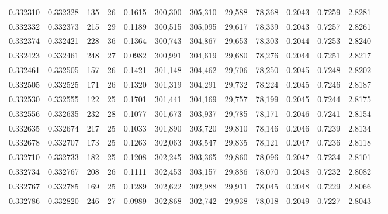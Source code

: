 \begin{tabular}{rrrrrrrrrrrrr}
0.332310 & 0.332328 &   135 &  26 &                                     0.1615 & 300,300 & 305,310 &  29,588 &  78,368 & 0.2043 & 0.7259 & 2.8281 \\
0.332332 & 0.332373 &   215 &  29 &                                     0.1189 & 300,515 & 305,095 &  29,617 &  78,339 & 0.2043 & 0.7257 & 2.8261 \\
0.332374 & 0.332421 &   228 &  36 &                                     0.1364 & 300,743 & 304,867 &  29,653 &  78,303 & 0.2044 & 0.7253 & 2.8240 \\
0.332423 & 0.332461 &   248 &  27 &                                     0.0982 & 300,991 & 304,619 &  29,680 &  78,276 & 0.2044 & 0.7251 & 2.8217 \\
0.332461 & 0.332505 &   157 &  26 &                                     0.1421 & 301,148 & 304,462 &  29,706 &  78,250 & 0.2045 & 0.7248 & 2.8202 \\
0.332505 & 0.332525 &   171 &  26 &                                     0.1320 & 301,319 & 304,291 &  29,732 &  78,224 & 0.2045 & 0.7246 & 2.8187 \\
0.332530 & 0.332555 &   122 &  25 &                                     0.1701 & 301,441 & 304,169 &  29,757 &  78,199 & 0.2045 & 0.7244 & 2.8175 \\
0.332556 & 0.332635 &   232 &  28 &                                     0.1077 & 301,673 & 303,937 &  29,785 &  78,171 & 0.2046 & 0.7241 & 2.8154 \\
0.332635 & 0.332674 &   217 &  25 &                                     0.1033 & 301,890 & 303,720 &  29,810 &  78,146 & 0.2046 & 0.7239 & 2.8134 \\
0.332678 & 0.332707 &   173 &  25 &                                     0.1263 & 302,063 & 303,547 &  29,835 &  78,121 & 0.2047 & 0.7236 & 2.8118 \\
0.332710 & 0.332733 &   182 &  25 &                                     0.1208 & 302,245 & 303,365 &  29,860 &  78,096 & 0.2047 & 0.7234 & 2.8101 \\
0.332734 & 0.332767 &   208 &  26 &                                     0.1111 & 302,453 & 303,157 &  29,886 &  78,070 & 0.2048 & 0.7232 & 2.8082 \\
0.332767 & 0.332785 &   169 &  25 &                                     0.1289 & 302,622 & 302,988 &  29,911 &  78,045 & 0.2048 & 0.7229 & 2.8066 \\
0.332786 & 0.332820 &   246 &  27 &                                     0.0989 & 302,868 & 302,742 &  29,938 &  78,018 & 0.2049 & 0.7227 & 2.8043 \\

\end{tabular}
